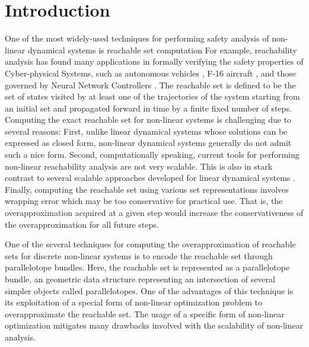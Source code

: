 \chapter{Introduction}
\label{sec:intro}




One of the most widely-used techniques for performing safety analysis of non-linear dynamical systems is reachable set computation
%
For example, reachability analysis has found many applications in formally verifying the safety properties of Cyber-physical Systems, such as autonomous vehicles \cite{althoff2010reachability}, F-16 aircraft \cite{heidlauf2018verification}, and those governed by Neural Network Controllers \cite{tran2019star, fan2020reachnn, bak2021nnenum}.
%
The reachable set is defined to be the set of states visited by at least one of the trajectories of the system starting from an initial set and propagated forward in time by a finite fixed number of steps.
%
Computing the exact reachable set for non-linear systems is challenging due to several reasons:
%
First, unlike linear dynamical systems whose solutions can be expressed as closed form, non-linear dynamical systems generally do not admit such a nice form.
%
Second, computationally speaking, current tools for performing non-linear reachability analysis are not very scalable. This is also in stark contrast to several scalable approaches developed for linear dynamical systems \cite{duggirala2016parsimonious, bak2017simulation}.
%
Finally, computing the reachable set using various set representations involves wrapping error which may be too conservative for practical use.
%
That is, the overapproximation acquired at a given step would increase the conservativeness of the overapproximation for all future steps.

One of the several techniques for computing the overapproximation of reachable sets for discrete non-linear systems is to encode the reachable set through parallelotope bundles.
%
Here, the reachable set is represented as a parallelotope bundle, an geometric data structure representing an intersection of several simpler objects called parallelotopes.
%
One of the advantages of this technique is its exploitation of a special form of non-linear optimization problem to overapproximate the reachable set.
%
The usage of a specific form of non-linear optimization mitigates many drawbacks involved with the scalability of non-linear analysis.

